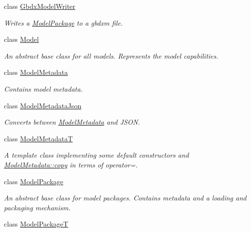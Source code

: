 \begin{DoxyCompactItemize}
class \hyperlink{classdg_1_1deepcore_1_1classification_1_1_gbdx_model_writer}{Gbdx\+Model\+Writer}
\begin{DoxyCompactList}\small\item\em Writes a \hyperlink{classdg_1_1deepcore_1_1classification_1_1_model_package}{Model\+Package} to a gbdxm file. \end{DoxyCompactList}\item 
class \hyperlink{classdg_1_1deepcore_1_1classification_1_1_model}{Model}
\begin{DoxyCompactList}\small\item\em An abstract base class for all models. Represents the model capabilities. \end{DoxyCompactList}\item 
class \hyperlink{classdg_1_1deepcore_1_1classification_1_1_model_metadata}{Model\+Metadata}
\begin{DoxyCompactList}\small\item\em Contains model metadata. \end{DoxyCompactList}\item 
class \hyperlink{classdg_1_1deepcore_1_1classification_1_1_model_metadata_json}{Model\+Metadata\+Json}
\begin{DoxyCompactList}\small\item\em Converts between \hyperlink{classdg_1_1deepcore_1_1classification_1_1_model_metadata}{Model\+Metadata} and J\+S\+ON. \end{DoxyCompactList}\item 
class \hyperlink{classdg_1_1deepcore_1_1classification_1_1_model_metadata_t}{Model\+MetadataT}
\begin{DoxyCompactList}\small\item\em A template class implementing some default constructors and \hyperlink{group___classification_module_ga851d179b56e5c32b25512df0141f3ca2}{Model\+Metadata\+::copy} in terms of operator=. \end{DoxyCompactList}\item 
class \hyperlink{classdg_1_1deepcore_1_1classification_1_1_model_package}{Model\+Package}
\begin{DoxyCompactList}\small\item\em An abstract base class for model packages. Contains metadata and a loading and packaging mechanism. \end{DoxyCompactList}\item 
class \hyperlink{classdg_1_1deepcore_1_1classification_1_1_model_package_t}{Model\+PackageT}

\end{DoxyCompactItemize}
